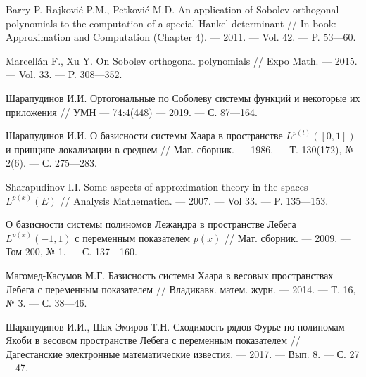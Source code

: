 \begin{thebibliography}{11}
{Barry P. Rajkovi\'c P.M., Petkovi\'c M.D.}
An application of Sobolev orthogonal polynomials to the computation of a special Hankel determinant
//
In book: Approximation and Computation (Chapter 4).
--- 2011.
--- Vol. 42.
--- P. 53---60.





{Marcell\'an F., Xu Y.}
On Sobolev orthogonal polynomials
//
Expo Math.
--- 2015.
--- Vol. 33.
--- P. 308---352.





Шарапудинов И.И.
Ортогональные по Соболеву системы функций и некоторые их приложения
//
УМН
--- 74:4(448)
--- 2019.
--- С. 87---164.





Шарапудинов И.И.
О базисности системы Хаара в пространстве $L^{p(t)}([0,1])$ и принципе локализации в среднем
//
Мат. сборник.
--- 1986.
--- Т. 130(172), № 2(6).
--- С. 275---283.




Sharapudinov I.I. Some aspects of approximation theory in the spaces $L^{p(x)}(E)$
//
Analysis Mathematica.
--- 2007.
--- Vol 33.
--- P. 135---153.





О базисности системы полиномов Лежандра в пространстве Лебега $L^{p(x)}(-1,1)$ с переменным показателем $p(x)$ // Мат. сборник. --- 2009. --- Том 200, № 1. --- С. 137---160.





Магомед-Касумов М.Г.
Базисность системы Хаара в весовых пространствах Лебега с переменным показателем
//
Владикавк. матем. журн.
--- 2014.
--- Т. 16, № 3.
--- С. 38---46.





Шарапудинов И.И., Шах-Эмиров Т.Н. Сходимость рядов Фурье по полиномам Якоби в весовом пространстве Лебега с переменным показателем // Дагестанские электронные математические известия. --- 2017. --- Вып. 8. --- С. 27---47.







\end{thebibliography}
